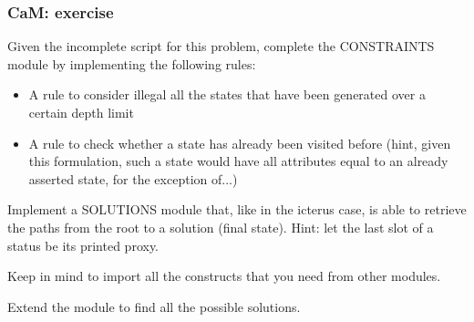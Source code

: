 \documentclass[xcolor={usenames,dvipsnames,svgnames}, compress]{beamer}
\begin{document}
\begin{frame}
  \frametitle{CaM: exercise}
  Given the incomplete script for this problem, complete the
  CONSTRAINTS module by implementing the following rules:
  \begin{itemize}
  \item A rule to consider illegal all the states that have been
    generated over a certain depth limit
  \item A rule to check whether a state has already been visited
    before (hint, given this formulation, such a state would have all
    attributes equal to an already asserted state, for the exception of...)
  \end{itemize}\bigskip
 Implement a SOLUTIONS module that, like in the icterus case, is able
 to retrieve the paths from the root to a solution (final
 state). Hint: let the last slot of a status be its printed proxy.\par
 Keep in mind to import all the constructs that you need from other modules.\par\bigskip

 Extend the module to find all the possible solutions.
\end{frame}
\end{document}
